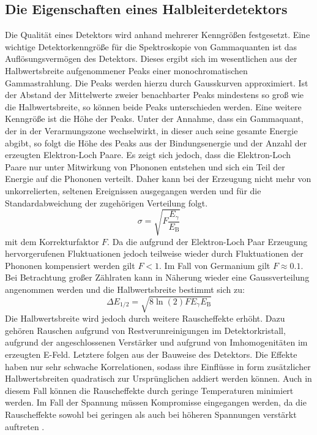 \subsection{Die Eigenschaften eines Halbleiterdetektors}%
Die Qualität eines Detektors wird anhand mehrerer Kenngrößen festgesetzt.
Eine wichtige Detektorkenngröße für die Spektroskopie von Gammaquanten ist das Auflösungsvermögen des Detektors. Dieses ergibt sich im wesentlichen aus der Halbwertsbreite aufgenommener Peaks einer monochromatischen Gammastrahlung. Die Peaks werden hierzu durch Gausskurven approximiert. Ist der Abstand der Mittelwerte zweier benachbarter Peaks mindestens so groß wie die Halbwertsbreite, so können beide Peaks unterschieden werden. Eine weitere Kenngröße ist die Höhe der Peaks. Unter der Annahme, dass ein Gammaquant, der in der Verarmungszone wechselwirkt, in dieser auch seine gesamte Energie abgibt, so folgt die Höhe des Peaks aus der Bindungsenergie und der Anzahl der erzeugten Elektron-Loch Paare. Es zeigt sich jedoch, dass die Elektron-Loch Paare nur unter Mitwirkung von Phononen entstehen und sich ein Teil der Energie auf die Phononen verteilt. Daher kann bei der Erzeugung nicht mehr von unkorrelierten, seltenen Ereignissen ausgegangen werden und für die Standardabweichung der zugehörigen Verteilung folgt.
\begin{equation}
\sigma = \sqrt{F \frac{E_\gamma}{E_\text{B}} }
\end{equation}
mit dem Korrekturfaktor $F$. Da die aufgrund der Elektron-Loch Paar Erzeugung hervorgerufenen Fluktuationen jedoch teilweise wieder durch Fluktuationen der Phononen kompensiert werden gilt $F < 1$. Im Fall von Germanium gilt $F \approx 0.1$. Bei Betrachtung großer Zählraten kann in Näherung wieder eine Gaussverteilung angenommen werden und die Halbwertsbreite bestimmt sich zu:
\begin{equation}
\Delta E_\text{1/2} = \sqrt{8 \ln(2) F E_\gamma E_\text{B}} \label{eq:deltE}
\end{equation}
Die Halbwertsbreite wird jedoch durch weitere Rauscheffekte erhöht. Dazu gehören Rauschen aufgrund von Restverunreinigungen im Detektorkristall, aufgrund der angeschlossenen Verstärker und aufgrund von Imhomogenitäten im erzeugten E-Feld. Letztere folgen aus der Bauweise des Detektors. Die Effekte haben nur sehr schwache Korrelationen, sodass ihre Einflüsse in form zusätzlicher Halbwertsbreiten quadratisch zur Ursprünglichen addiert werden können. Auch in diesem Fall können die Rauscheffekte durch geringe Temperaturen minimiert werden. Im Fall der Spannung müssen Kompromisse eingegangen werden, da die Rauscheffekte sowohl bei geringen als auch bei höheren Spannungen verstärkt auftreten .

